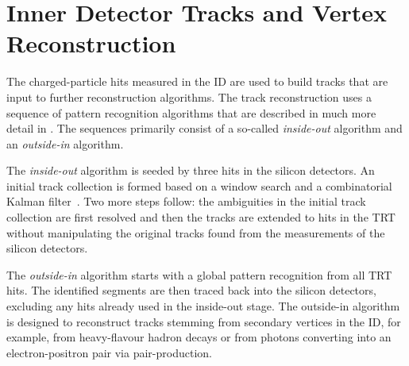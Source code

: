 \section{Inner Detector Tracks and Vertex Reconstruction}
The charged-particle hits measured in the ID are used to build tracks that are input to further reconstruction algorithms.
The track reconstruction uses a sequence of pattern recognition algorithms that are described in much more detail in . The sequences primarily consist of a so-called \emph{inside-out} algorithm and an \emph{outside-in} algorithm.

The \emph{inside-out} algorithm is seeded by three hits in the silicon detectors. An initial track collection is formed based on a window search and a combinatorial Kalman filter~\cite{fruhwirth_application_1987}. Two more steps follow: the ambiguities in the initial track collection are first resolved and then the tracks are extended to hits in the TRT without manipulating the original tracks found from the measurements of the silicon detectors.

The \emph{outside-in} algorithm starts with a global pattern recognition from all TRT hits. The identified segments are then traced back into the silicon detectors, excluding any hits already used in the inside-out stage. The outside-in algorithm is designed to reconstruct tracks stemming from secondary vertices in the ID, for example, from heavy-flavour hadron decays or from photons converting into an electron-positron pair via pair-production.


